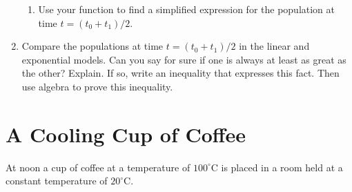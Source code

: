 \documentclass{ximera}
\begin{document}
\begin{example}
\begin{enumerate}
\begin{enumerate}
\item Use your function to find a simplified expression for the population at time $t=(t_0+t_1)/2$.

\end{enumerate}

\item Compare the populations at time $t=(t_0+t_1)/2$ in the linear and exponential models. Can you say for sure if one is always at least as great as the other? Explain. If so, write an inequality that expresses this fact. Then use algebra to prove this inequality.

\end{enumerate}
\end{example}


\section{A Cooling Cup of Coffee}
At noon a cup of coffee at a temperature of $100^\circ$C is placed in a room held at a constant temperature of $20^\circ$C.
\end{document}
